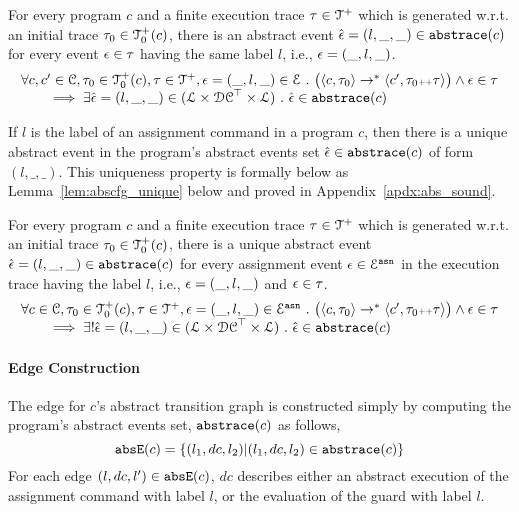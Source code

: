 \begin{lem}
\label{lem:abscfg_sound}
For every program $c$ and
a finite execution trace $\mathtt{\tau} \in \mathcal{T}^{+}$ which is generated w.r.t.
an initial trace  $\mathtt{\tau}_0 \in \mathcal{T}^{+}_0(c)$,
there is an abstract event $\hat{\mathtt{\epsilon}{}} = (l, \_, \_) \in \mathtt{abs}{\mathtt{trace}}(c)$ 
for every event $\mathtt{\epsilon} \in \mathtt{\tau}$ having the same label $l$, i.e., $\mathtt{\epsilon} = (\_, l, \_)$.
%
\[
\begin{array}{l}
  \forall c, c' \in \mathcal{C}, \mathtt{\tau}_0 \in \mathcal{T}^{+}_0(c), \mathtt{\tau} \in \mathcal{T}^{+} ,  \mathtt{\epsilon} = (\_, l, \_) \in \mathcal{E} ~.~
  \big(
    \langle {c}, \mathtt{\tau}_0 \rangle \to^{*} \langle c', \mathtt{\tau}_0 {\scriptscriptstyle ++} \mathtt{\tau} \rangle 
  \big)
  \land \mathtt{\epsilon} \in \mathtt{\tau} 
  \\
  \qquad \implies \exists \hat{\mathtt{\epsilon}{}} = (l, \_, \_) \in (\mathcal{L}\times \mathcal{DC}^{\top} \times \mathcal{L}) ~.~ 
  \hat{\mathtt{\epsilon}{}} \in \mathtt{abs}{\mathtt{trace}}(c)
\end{array}
\]
\end{lem}
If $l$ is the label of an assignment command in a program $c$,
then there is a unique abstract event in the program's abstract events set
$\hat{\mathtt{\epsilon}{}} \in \mathtt{abs}{\mathtt{trace}}(c)$ of form $(l, \_, \_)$. This uniqueness property is formally below as Lemma~\ref{lem:abscfg_unique} below
and proved in Appendix~\ref{apdx:abs_sound}.
\begin{lem}
\label{lem:abscfg_unique}
For every program $c$ and
a finite execution trace $\mathtt{\tau} \in \mathcal{T}^{+}$ which is generated w.r.t.
an initial trace $\mathtt{\tau}_0 \in \mathcal{T}^{+}_0(c)$,
there is a unique abstract event $\hat{\mathtt{\epsilon}{}} = (l, \_, \_) \in \mathtt{abs}{\mathtt{trace}}(c)$ 
for every assignment event $\mathtt{\epsilon} \in \mathcal{E}^{\mathtt{{asn}}}$ in the
execution trace having the label $l$, i.e., $\mathtt{\epsilon} = (\_, l, \_)$ and $\mathtt{\epsilon} \in \mathtt{\tau}$.
%
\[
  \begin{array}{l}
  \forall c \in \mathcal{C}, \mathtt{\tau}_0 \in \mathcal{T}^{+}_0(c), \mathtt{\tau} \in \mathcal{T}^{+} ,  \mathtt{\epsilon} = (\_, l, \_) \in \mathcal{E}^{\mathtt{{asn}}} ~.~
  \big(
    \langle {c}, \mathtt{\tau}_0 \rangle \to^{*} \langle c', \mathtt{\tau}_0 {\scriptscriptstyle ++} \mathtt{\tau} \rangle 
  \big)
  \land \mathtt{\epsilon} \in \mathtt{\tau} 
  \\
  \qquad \implies \exists ! \hat{\mathtt{\epsilon}{}} = (l, \_, \_) \in (\mathcal{L}\times \mathcal{DC}^{\top} \times \mathcal{L}) ~.~ 
  \hat{\mathtt{\epsilon}{}} \in \mathtt{abs}{\mathtt{trace}}(c)
  \end{array}
\]
\end{lem}
%
\paragraph{Edge Construction}
The edge for $c$'s abstract transition graph is constructed simply by computing the program's abstract events set, $\mathtt{abs}{\mathtt{trace}}(c)$ as follows,
  \[
    \mathtt{abs}{\mathtt{E}}(c) = \{(l_1, dc, l_2) | (l_1, dc, l_2) \in \mathtt{abs}{\mathtt{trace}}(c)\}
  \]
For each edge $(l, dc, l') \in \mathtt{abs}{\mathtt{E}}(c)$, $dc$ describes either an abstract execution of the assignment command with label $l$,
or the evaluation of the guard with label $l$.
%
